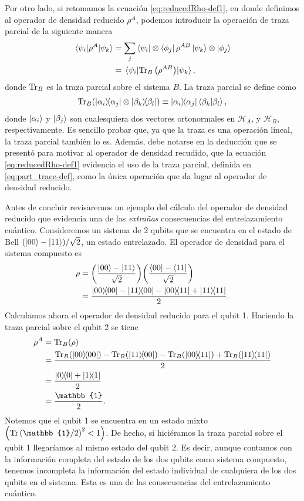 Por otro lado, si retomamos la ecuación \eqref{eq:reducedRho-def1},
en donde definimos al operador de densidad reducido $\rho^A$, podemos
introducir la operación de traza parcial de la siguiente manera
\begin{align}
	\matrixel{\psi_i}{\rho^A}{\psi_k} &= 
	\sum _j \bra{\psi_i}\ten\bra{\phi_j}\rho^{AB}\ket{\psi_k}\ten\ket{\phi_j}\\
	&=\matrixel{\psi_i}{\Tr_B\qty(\rho^{AB})}{\psi_k},
	\label{eq:partialTrace-def}
\end{align}
donde $\Tr_B$ es la traza parcial sobre el sistema $B$. La traza parcial
se define como \cite{nielsen_chuang_2011}
\begin{align}
	\Tr_B (\dyad{\alpha_i}{\alpha_j}\otimes \dyad{\beta_k}{\beta_l})
	\equiv
	\dyad{\alpha_i}{\alpha_j}\braket{\beta_k}{\beta_l},
	\label{eq:part_trace-def}
\end{align}
donde $\ket{\alpha_i}$ y $\ket{\beta_j}$ son cualesquiera dos vectores
ortonormales en
$\mathcal{H}_A$, y $\mathcal{H}_B$, respectivamente. Es sencillo probar
que, ya que la traza es una operación lineal, la traza parcial también 
lo es. 
Además, debe notarse en la deducción que se presentó para motivar 
al operador de densidad recudido, 
que la ecuación \eqref{eq:reducedRho-def1} evidencia 
el uso de la traza parcial, definida en \eqref{eq:part_trace-def}, 
como la única operación que da lugar al operador de densidad reducido. 

Antes de concluir revisaremos un ejemplo del cálculo del 
operador de densidad reducido que evidencia una de las
\textit{extrañas} consecuencias del
entrelazamiento cuántico.
Consideremos un sistema de 2 qubits que se encuentra en el estado de Bell
$\qty(\ket{00}-\ket{11})/\sqrt{2}$, un estado entrelazado. El operador
de densidad para el sistema compuesto es
\begin{align}
	\rho &= \qty(\frac{\ket{00}-\ket{11}}{\sqrt{2}})
	\qty(\frac{\bra{00}-\bra{11}}{\sqrt{2}}) \\
			 &= \frac{\dyad{00}{00}-\dyad{11}{00}-\dyad{00}{11}
                 +\dyad{11}{11}}{2}.
\end{align}
Calculamos ahora el operador de densidad reducido para el qubit 1.  
Haciendo la traza parcial sobre el qubit 2 se tiene
\begin{align}
	\rho^A &= \Tr _B(\rho) \\
			 	 &= \frac{\Tr _B(\dyad{00}{00})-\Tr _B(\dyad{11}{00})
			 	 -\Tr _B(\dyad{00}{11})+\Tr _B(\dyad{11}{11})}{2} \\
			 	 &= \frac{\dyad{0}{0} + \dyad{1}{1}}{2} \\
			 	 &= \frac{\mathbb{1}}{2}.
\end{align}
Notemos que el qubit 1 se encuentra en un estado mixto
$\qty(\Tr \qty(\mathbb{1}/2)^2<1)$. De hecho, si hiciéramos la 
traza parcial sobre el qubit 1 llegaríamos al mismo estado del qubit 2.
Es decir, aunque contamos con la información completa del estado 
de los dos qubits como sistema compuesto, tenemos incompleta la 
información del estado individual de cualquiera de los dos qubits
en el sistema. Esta es una de las consecuencias del entrelazamiento
cuántico.

